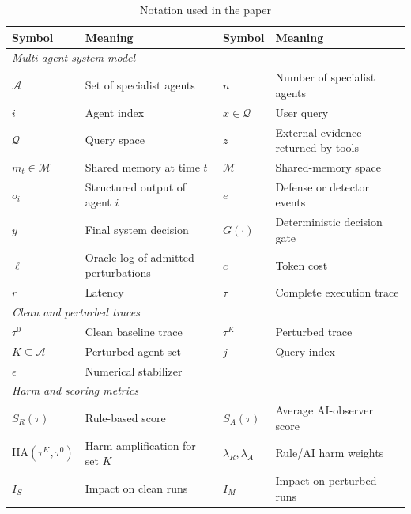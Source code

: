 \begin{table}[!ht]
\centering
\caption{Notation used in the paper}
\label{tab:notation}
\small\addtolength{\tabcolsep}{-3.5pt}
\begin{tabular}{llll}
\toprule
\textbf{Symbol} & \textbf{Meaning} & \textbf{Symbol} & \textbf{Meaning} \\
\midrule

\multicolumn{4}{l}{\textit{Multi-agent system model}} \\
$\mathcal{A}$ & Set of specialist agents & $n$ & Number of specialist agents \\
$i$ & Agent index & $x \in \mathcal{Q}$ & User query \\
$\mathcal{Q}$ & Query space & $z$ & External evidence returned by tools \\
$m_t \in \mathcal{M}$ & Shared memory at time $t$ & $\mathcal{M}$ & Shared-memory space \\
$o_i$ & Structured output of agent $i$ & $e$ & Defense or detector events \\
$y$ & Final system decision & $G(\cdot)$ & Deterministic decision gate \\
$\ell$ & Oracle log of admitted perturbations & $c$ & Token cost \\
$r$ & Latency & $\tau$ & Complete execution trace \\

\midrule
\multicolumn{4}{l}{\textit{Clean and perturbed traces}} \\
$\tau^0$ & Clean baseline trace & $\tau^K$ & Perturbed trace \\
$K \subseteq \mathcal{A}$ & Perturbed agent set & $j$ & Query index \\
$\epsilon$ & Numerical stabilizer & & \\

\midrule
\multicolumn{4}{l}{\textit{Harm and scoring metrics}} \\
$S_R(\tau)$ & Rule-based score & $S_A(\tau)$ & Average AI-observer score \\
$\mathrm{HA}(\tau^K,\tau^0)$ & Harm amplification for set $K$ & $\lambda_R,\lambda_A$ & Rule/AI harm weights \\
$I_S$ & Impact on clean runs & $I_M$ & Impact on perturbed runs \\


\end{tabular}
\end{table}
